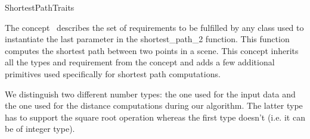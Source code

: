
\ccRefPageBegin

\begin{ccRefConcept}{ShortestPathTraits}
\label{pageShortestPathTraitsRef}

\ccDefinition

The concept \ccRefName\  describes the set of requirements to be fulfilled by
any class used to instantiate the last parameter in the shortest\_path\_2 
 function. This function computes the shortest path between
two points in a scene.
This concept inherits all the types and requirement from the
 concept and adds a few additional primitives used
specifically for shortest path computations.

We distinguish two different number types: the one used for the input data and
the one used for the distance computations during our algorithm. The latter type
has to support the square root operation whereas the first type doesn't (i.e. it 
can be of integer type).

\ccTypes
{}
\ccThreeToTwo

\ccGlue
{}
\ccGlue
{}
\ccGlue
{}


\ccCreation
{}


\end{ccRefConcept}
